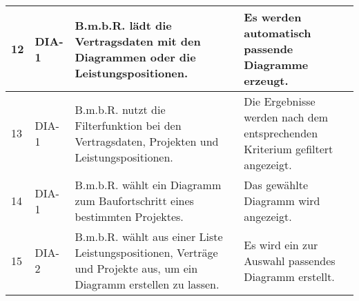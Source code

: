 \begin{longtable}[c]{|p{1cm}|p{3cm}|p{4cm}|p{6cm}|}
    12           & DIA-1                      & B.m.b.R. lädt die Vertragsdaten mit den Diagrammen oder die Leistungspositionen.                                   & Es werden automatisch passende Diagramme erzeugt.                                                                                                                          \\ \hline
    13           & DIA-1                      & B.m.b.R. nutzt die Filterfunktion bei den Vertragsdaten, Projekten und Leistungspositionen.                        & Die Ergebnisse werden nach dem entsprechenden Kriterium gefiltert angezeigt.                                                                                               \\ \hline
    14           & DIA-1                      & B.m.b.R. wählt ein Diagramm zum Baufortschritt eines bestimmten Projektes.                                         & Das gewählte Diagramm wird angezeigt.                                                                                                                                      \\ \hline
    15           & DIA-2                      & B.m.b.R. wählt aus einer Liste Leistungspositionen, Verträge und Projekte aus, um ein Diagramm erstellen zu lassen. & Es wird ein zur Auswahl passendes Diagramm erstellt.                                                                                                                      \\ \hline
\end{longtable}